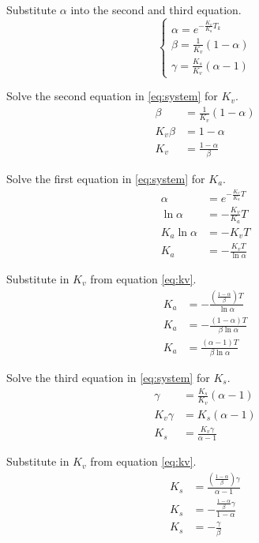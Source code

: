 \documentclass[10pt,conference,compsoc]{IEEEtran}
\begin{document}
Substitute $\alpha$ into the second and third equation.
\begin{equation}
  \begin{cases}
    \alpha = e^{-\frac{K_v}{K_a} T_k} \\
    \beta = \frac{1}{K_v}(1 - \alpha) \\
    \gamma = \frac{K_s}{K_v}(\alpha - 1)
  \end{cases} \label{eq:system}
\end{equation}

Solve the second equation in \eqref{eq:system} for $K_v$.
\begin{align}
  \beta &= \frac{1}{K_v}(1 - \alpha) \nonumber \\
  K_v \beta &= 1 - \alpha \nonumber \\
  K_v &= \frac{1 - \alpha}{\beta} \label{eq:kv}
\end{align}

Solve the first equation in \eqref{eq:system} for $K_a$.
\begin{align*}
  \alpha &= e^{-\frac{K_v}{K_a} T} \\
  \ln\alpha &= -\frac{K_v}{K_a} T \\
  K_a \ln\alpha &= -K_v T \\
  K_a &= -\frac{K_v T}{\ln\alpha}
\end{align*}

Substitute in $K_v$ from equation \eqref{eq:kv}.
\begin{align}
  K_a &= -\frac{\left(\frac{1 - \alpha}{\beta}\right) T}{\ln\alpha} \nonumber \\
  K_a &= -\frac{(1 - \alpha) T}{\beta \ln\alpha} \nonumber \\
  K_a &= \frac{(\alpha - 1) T}{\beta \ln\alpha}
\end{align}

Solve the third equation in \eqref{eq:system} for $K_s$.
\begin{align*}
  \gamma &= \frac{K_s}{K_v}(\alpha - 1) \\
  K_v \gamma &= K_s(\alpha - 1) \\
  K_s &= \frac{K_v \gamma}{\alpha - 1}
\end{align*}

Substitute in $K_v$ from equation \eqref{eq:kv}.
\begin{align}
  K_s &= \frac{\left(\frac{1 - \alpha}{\beta}\right) \gamma}{\alpha - 1}
    \nonumber \\
  K_s &= -\frac{\frac{1 - \alpha}{\beta} \gamma}{1 - \alpha}
    \nonumber \\
  K_s &= -\frac{\gamma}{\beta}
\end{align}
\end{document}
